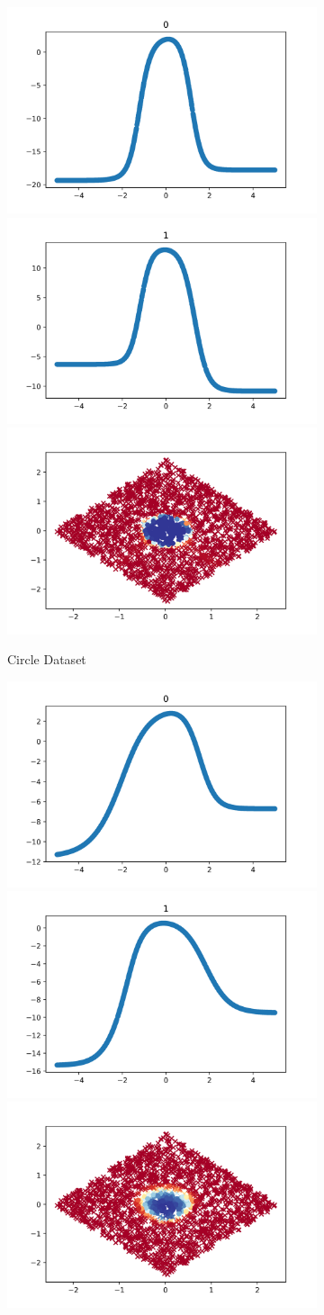 \begin{figure}[!h]
    \centering
    \begin{subfigure}{1.0\textwidth}
        \centering
        \includegraphics[width=.33\textwidth]{fig/mnl/ci1.png}%
        \includegraphics[width=.33\textwidth]{fig/mnl/ci2.png}%
        \includegraphics[width=.33\textwidth]{fig/plt/ci.png}
        \caption{Circle Dataset}
    \end{subfigure}
    \begin{subfigure}{1.0\textwidth}
        \centering
        \includegraphics[width=.33\textwidth]{fig/mnl/el1.png}%
        \includegraphics[width=.33\textwidth]{fig/mnl/el2.png}%
        \includegraphics[width=.33\textwidth]{fig/plt/el.png}

\end{subfigure}
\end{figure}
